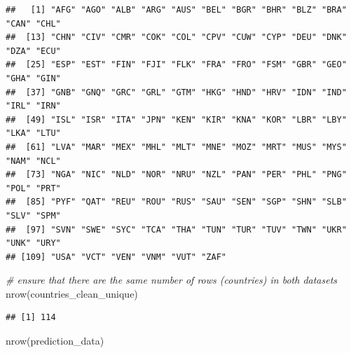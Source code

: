 \documentclass[
]{article}
\newenvironment{Shaded}{\begin{snugshade}}{\end{snugshade}}
\newcommand{\AttributeTok}[1]{\textcolor[rgb]{0.77,0.63,0.00}{#1}}
\newcommand{\CommentTok}[1]{\textcolor[rgb]{0.56,0.35,0.01}{\textit{#1}}}
\newcommand{\DecValTok}[1]{\textcolor[rgb]{0.00,0.00,0.81}{#1}}
\newcommand{\FunctionTok}[1]{\textcolor[rgb]{0.00,0.00,0.00}{#1}}
\newcommand{\NormalTok}[1]{#1}
\newcommand{\OtherTok}[1]{\textcolor[rgb]{0.56,0.35,0.01}{#1}}
\newcommand{\SpecialCharTok}[1]{\textcolor[rgb]{0.00,0.00,0.00}{#1}}
\begin{document}
\begin{Shaded}
\end{Shaded}

\begin{verbatim}
##   [1] "AFG" "AGO" "ALB" "ARG" "AUS" "BEL" "BGR" "BHR" "BLZ" "BRA" "CAN" "CHL"
##  [13] "CHN" "CIV" "CMR" "COK" "COL" "CPV" "CUW" "CYP" "DEU" "DNK" "DZA" "ECU"
##  [25] "ESP" "EST" "FIN" "FJI" "FLK" "FRA" "FRO" "FSM" "GBR" "GEO" "GHA" "GIN"
##  [37] "GNB" "GNQ" "GRC" "GRL" "GTM" "HKG" "HND" "HRV" "IDN" "IND" "IRL" "IRN"
##  [49] "ISL" "ISR" "ITA" "JPN" "KEN" "KIR" "KNA" "KOR" "LBR" "LBY" "LKA" "LTU"
##  [61] "LVA" "MAR" "MEX" "MHL" "MLT" "MNE" "MOZ" "MRT" "MUS" "MYS" "NAM" "NCL"
##  [73] "NGA" "NIC" "NLD" "NOR" "NRU" "NZL" "PAN" "PER" "PHL" "PNG" "POL" "PRT"
##  [85] "PYF" "QAT" "REU" "ROU" "RUS" "SAU" "SEN" "SGP" "SHN" "SLB" "SLV" "SPM"
##  [97] "SVN" "SWE" "SYC" "TCA" "THA" "TUN" "TUR" "TUV" "TWN" "UKR" "UNK" "URY"
## [109] "USA" "VCT" "VEN" "VNM" "VUT" "ZAF"
\end{verbatim}

\begin{Shaded}
\begin{Highlighting}[]
\CommentTok{\# ensure that there are the same number of rows (countries) in both datasets}
\FunctionTok{nrow}\NormalTok{(countries\_clean\_unique)}
\end{Highlighting}
\end{Shaded}

\begin{verbatim}
## [1] 114
\end{verbatim}

\begin{Shaded}
\begin{Highlighting}[]
\FunctionTok{nrow}\NormalTok{(prediction\_data)}
\end{Highlighting}
\end{Shaded}
\end{document}
